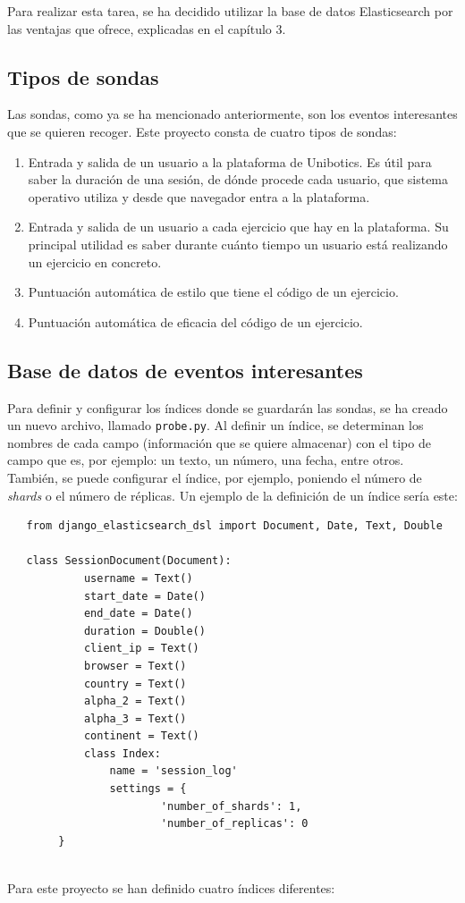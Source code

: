 Para realizar esta tarea, se ha decidido utilizar la base de datos Elasticsearch por las ventajas que ofrece, explicadas en el capítulo 3.

\subsection{Tipos de sondas}
Las sondas, como ya se ha mencionado anteriormente, son los eventos interesantes que se quieren recoger. Este proyecto consta de cuatro tipos de sondas:
\begin{enumerate}
\item Entrada y salida de un usuario a la plataforma de Unibotics. Es útil para saber la duración de una sesión, de dónde procede cada usuario, que sistema operativo utiliza y desde que navegador entra a la plataforma.
\item Entrada y salida de un usuario a cada ejercicio que hay en la plataforma. Su principal utilidad es saber durante cuánto tiempo un usuario está realizando un ejercicio en concreto.
\item Puntuación automática de estilo que tiene el código de un ejercicio.
\item Puntuación automática de eficacia del código de un ejercicio.
\end{enumerate}

\subsection{Base de datos de eventos interesantes}
Para definir y configurar los índices donde se guardarán las sondas, se ha creado un nuevo archivo, llamado \texttt{probe.py}. Al definir un índice, se determinan los nombres de cada campo (información que se quiere almacenar) con el tipo de campo que es, por ejemplo: un texto, un número, una fecha, entre otros. También, se puede configurar el índice, por ejemplo, poniendo el número de\textit{ shards }o el número de réplicas. Un ejemplo de la definición de un índice sería este: \\

\begin{lstlisting}
   from django_elasticsearch_dsl import Document, Date, Text, Double
   
   class SessionDocument(Document):
    		username = Text()
  	  		start_date = Date()
   			end_date = Date()
    		duration = Double()
    		client_ip = Text()
    		browser = Text()
    		country = Text()
    		alpha_2 = Text()
    		alpha_3 = Text()
    		continent = Text()
    		class Index:
        		name = 'session_log'
        		settings = {
            			'number_of_shards': 1,
           				'number_of_replicas': 0
        }
\end{lstlisting} 
\\
Para este proyecto se han definido cuatro índices diferentes:

